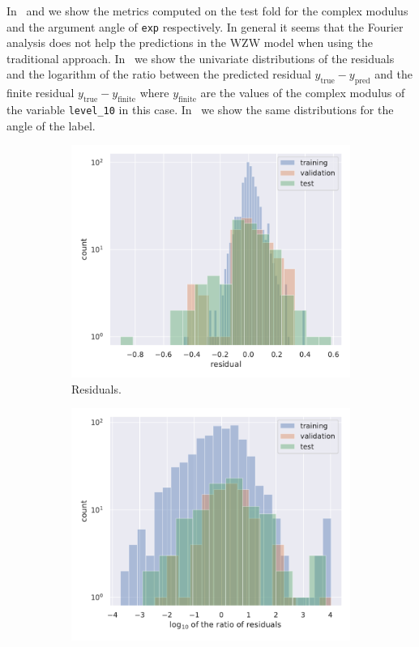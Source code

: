 In~ and  we show the metrics computed on the test fold for the complex modulus and the argument angle of \texttt{exp} respectively.
In general it seems that the Fourier analysis does not help the predictions in the WZW model when using the traditional approach.
In~ we show the univariate distributions of the residuals and the logarithm of the ratio between the predicted residual $y_{\text{true}} - y_{\text{pred}}$ and the finite residual $y_{\text{true}} - y_{\text{finite}}$ where $y_{\text{finite}}$ are the values of the complex modulus of the variable \texttt{level\_10} in this case.
In~ we show the same distributions for the angle of the label.

\begin{figure}[htbp]
  \centering
  \begin{subfigure}[b]{0.45\linewidth}
    \centering
    \includegraphics[width=\linewidth]{img/wzw_ann_residual_histogram_compare_mod}
    \caption{Residuals.}
  \end{subfigure}
  \begin{subfigure}[b]{0.45\linewidth}
    \centering
    \includegraphics[width=\linewidth]{img/wzw_ann_ratio_histogram_compare_mod}

\end{subfigure}
\end{figure}
